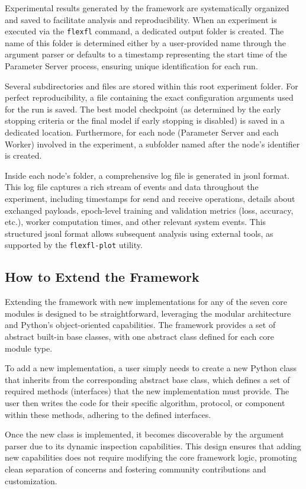 Experimental results generated by the framework are systematically organized and saved to facilitate analysis and reproducibility. When an experiment is executed via the \texttt{flexfl} command, a dedicated output folder is created. The name of this folder is determined either by a user-provided name through the argument parser or defaults to a timestamp representing the start time of the Parameter Server process, ensuring unique identification for each run. 

Several subdirectories and files are stored within this root experiment folder. For perfect reproducibility, a file containing the exact configuration arguments used for the run is saved. The best model checkpoint (as determined by the early stopping criteria or the final model if early stopping is disabled) is saved in a dedicated location. Furthermore, for each node (Parameter Server and each Worker) involved in the experiment, a subfolder named after the node's identifier is created. 

Inside each node's folder, a comprehensive log file is generated in \ac{jsonl} format. This log file captures a rich stream of events and data throughout the experiment, including timestamps for send and receive operations, details about exchanged payloads, epoch-level training and validation metrics (loss, accuracy, etc.), worker computation times, and other relevant system events. This structured \ac{jsonl} format allows subsequent analysis using external tools, as supported by the \texttt{flexfl-plot} utility.

\subsection{How to Extend the Framework}
\label{sec:framework-extension}

Extending the framework with new implementations for any of the seven core modules is designed to be straightforward, leveraging the modular architecture and Python's object-oriented capabilities. The framework provides a set of abstract built-in base classes, with one abstract class defined for each core module type. 

To add a new implementation, a user simply needs to create a new Python class that inherits from the corresponding abstract base class, which defines a set of required methods (interfaces) that the new implementation must provide. The user then writes the code for their specific algorithm, protocol, or component within these methods, adhering to the defined interfaces. 

Once the new class is implemented, it becomes discoverable by the argument parser due to its dynamic inspection capabilities. This design ensures that adding new capabilities does not require modifying the core framework logic, promoting clean separation of concerns and fostering community contributions and customization.
